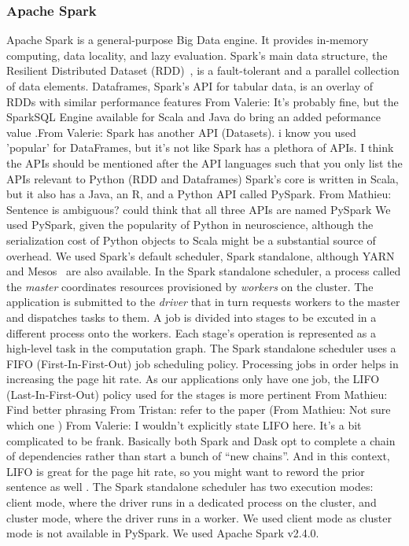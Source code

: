 \documentclass[conference]{IEEEtran}
\newcommand{\TG}[1]{\color{cyan}From Tristan: #1 \color{black}}
\newcommand{\MD}[1]{\color{magenta}From Mathieu: #1 \color{black}}
\newcommand{\VHS}[1]{\color{green}From Valerie: #1 \color{black}}
\begin{document}
\subsubsection{Apache Spark} Apache Spark is a general-purpose Big Data engine. It
provides in-memory computing, data locality, and lazy evaluation. Spark's main data
structure, the Resilient Distributed Dataset (RDD)~\cite{RDD}, is a fault-tolerant
and a parallel collection of data elements. Dataframes, Spark's API for tabular data,
is an overlay of RDDs with similar performance features \VHS{It's probably fine, but
the SparkSQL Engine available for Scala and Java do bring an added peformance
value}.\VHS{Spark has another API (Datasets). i know you used 'popular' for
DataFrames, but it's not like Spark has a plethora of APIs. I think the APIs should
be mentioned after the API languages such that you only list the APIs relevant to
Python (RDD and Dataframes)} Spark's core is written in Scala, but it also has a
Java, an R, and a Python API called PySpark. \MD{Sentence is ambiguous? could think
that all three APIs are named PySpark} We used PySpark, given the popularity of
Python in neuroscience, although the serialization cost of Python objects to Scala
might be a substantial source of overhead. We used Spark's default scheduler, Spark
standalone, although YARN~\cite{vavilapalli2013apache} and
Mesos~\cite{hindman2011mesos} are also available. In the Spark standalone scheduler,
a process called the \emph{master} coordinates resources provisioned by
\emph{workers} on the cluster. The application is submitted to the \emph{driver} that
in turn requests workers to the master and dispatches tasks to them. A job is divided
into stages to be excuted in a different process onto the workers. Each stage's
operation is represented as a high-level task in the computation graph. The Spark
standalone scheduler uses a FIFO (First-In-First-Out) job scheduling policy.
Processing jobs in order helps in increasing the page hit rate. As our applications
only have one job, the LIFO (Last-In-First-Out) policy used for the stages is more
pertinent \MD{Find better phrasing} \TG{refer to the paper (\MD{Not sure which one})}
\VHS{I wouldn't explicitly state LIFO here. It's a bit complicated to be frank.
Basically both Spark and Dask opt to complete a chain of dependencies rather than
start a bunch of ``new chains''. And in this context, LIFO is great for the page hit
rate, so you might want to reword the prior sentence as well}. The Spark standalone
scheduler has two execution modes: client mode, where the driver runs in a dedicated
process on the cluster, and cluster mode, where the driver runs in a worker. We used
client mode as cluster mode is not available in PySpark. We used Apache Spark v2.4.0.
\end{document}
